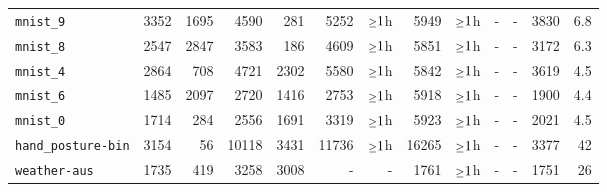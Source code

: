 \begin{tabular}{lrrrrrrrrrrrr}
\texttt{mnist\_9} & 3352 & 1695 & 4590 & 281 & 5252 & $\mathsmaller{\geq}1$h & 5949 & $\mathsmaller{\geq}1$h & - & - & 3830 & 6.8\\
\texttt{mnist\_8} & 2547 & 2847 & 3583 & 186 & 4609 & $\mathsmaller{\geq}1$h & 5851 & $\mathsmaller{\geq}1$h & - & - & 3172 & 6.3\\
\texttt{mnist\_4} & 2864 & 708 & 4721 & 2302 & 5580 & $\mathsmaller{\geq}1$h & 5842 & $\mathsmaller{\geq}1$h & - & - & 3619 & 4.5\\
\texttt{mnist\_6} & 1485 & 2097 & 2720 & 1416 & 2753 & $\mathsmaller{\geq}1$h & 5918 & $\mathsmaller{\geq}1$h & - & - & 1900 & 4.4\\
\texttt{mnist\_0} & 1714 & 284 & 2556 & 1691 & 3319 & $\mathsmaller{\geq}1$h & 5923 & $\mathsmaller{\geq}1$h & - & - & 2021 & 4.5\\
\texttt{hand\_posture-bin} & 3154 & 56 & 10118 & 3431 & 11736 & $\mathsmaller{\geq}1$h & 16265 & $\mathsmaller{\geq}1$h & - & - & 3377 & 42\\
\texttt{weather-aus} & 1735 & 419 & 3258 & 3008 & - & - & 1761 & $\mathsmaller{\geq}1$h & - & - & 1751 & 26\\
\bottomrule
\end{tabular}
